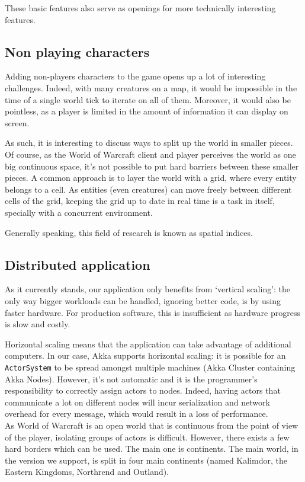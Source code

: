 \documentclass[paper=a4, fontsize=11pt]{scrartcl}
\begin{document}
These basic features also serve as openings for more technically interesting
features.

\subsection{Non playing characters}

Adding non-players characters to the game opens up a lot of interesting
challenges.
Indeed, with many creatures on a map, it would be impossible in the time of a
single world tick to iterate on all of them.
Moreover, it would also be pointless, as a player is limited in the amount of
information it can display on screen.

As such, it is interesting to discuss ways to split up the world in smaller
pieces.
Of course, as the World of Warcraft client and player perceives the world
as one big continuous space, it's not possible to put hard barriers between
these smaller pieces.
A common approach is to layer the world with a grid, where every entity belongs
to a cell. As entities (even creatures) can move freely between different cells 
of the grid, keeping the grid up to date in real time is a task in itself,
specially with a concurrent environment.

Generally speaking, this field of research is known as spatial indices.

\subsection{Distributed application}

As it currently stands, our application only benefits from `vertical scaling':
the only way bigger workloads can be handled, ignoring better code, is by using
faster hardware.
For production software, this is insufficient as hardware progress is slow
and costly.

Horizontal scaling means that the application can take advantage of additional
computers.
In our case, Akka supports horizontal scaling: it is possible for an
\texttt{ActorSystem} to be spread amongst multiple machines (Akka Cluster
containing Akka Nodes).
However, it's not automatic and it is the programmer's responsibility to
correctly assign actors to nodes.
Indeed, having actors that communicate a lot on different nodes will incur
serialization and network overhead for every message, which would result in a
loss of performance.\\

As World of Warcraft is an open world that is continuous from the point of view
of the player, isolating groups of actors is difficult.
However, there exists a few hard borders which can be used.
The main one is continents. The main world, in the version we support, is split
in four main continents (named Kalimdor, the Eastern Kingdoms, Northrend and
Outland).
\end{document}
